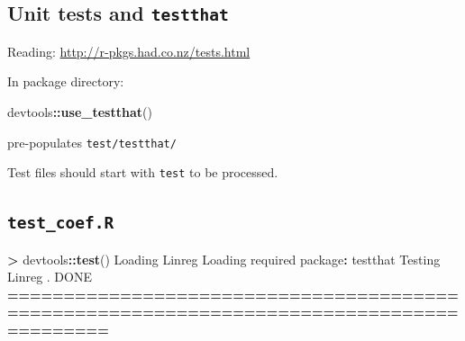 \documentclass[]{book}
\newenvironment{Shaded}{\begin{snugshade}}{\end{snugshade}}
\newcommand{\KeywordTok}[1]{\textcolor[rgb]{0.13,0.29,0.53}{\textbf{#1}}}
\newcommand{\DataTypeTok}[1]{\textcolor[rgb]{0.13,0.29,0.53}{#1}}
\newcommand{\DecValTok}[1]{\textcolor[rgb]{0.00,0.00,0.81}{#1}}
\newcommand{\StringTok}[1]{\textcolor[rgb]{0.31,0.60,0.02}{#1}}
\newcommand{\OperatorTok}[1]{\textcolor[rgb]{0.81,0.36,0.00}{\textbf{#1}}}
\newcommand{\ErrorTok}[1]{\textcolor[rgb]{0.64,0.00,0.00}{\textbf{#1}}}
\newcommand{\NormalTok}[1]{#1}
\theoremstyle{definition}
\theoremstyle{definition}
\theoremstyle{definition}
\theoremstyle{remark}
\begin{document}
\subsection{\texorpdfstring{Unit tests and
\texttt{testthat}}{Unit tests and testthat}}\label{unit-tests-and-testthat}

Reading: \url{http://r-pkgs.had.co.nz/tests.html}

In package directory:

\begin{Shaded}
\begin{Highlighting}[]
\NormalTok{devtools}\OperatorTok{::}\KeywordTok{use_testthat}\NormalTok{()}
\end{Highlighting}
\end{Shaded}

pre-populates \texttt{test/testthat/}

Test files should start with \texttt{test} to be processed.

\subsection{\texorpdfstring{\texttt{test\_coef.R}}{test\_coef.R}}\label{test_coef.r}

\begin{Shaded}
\end{Shaded}

\begin{Shaded}
\begin{Highlighting}[]
\OperatorTok{>}\StringTok{ }\NormalTok{devtools}\OperatorTok{::}\KeywordTok{test}\NormalTok{()}
\NormalTok{Loading Linreg}
\NormalTok{Loading required package}\OperatorTok{:}\StringTok{ }\NormalTok{testthat}
\NormalTok{Testing Linreg}
\NormalTok{.}
\NormalTok{DONE }\OperatorTok{==}\ErrorTok{=======================================================================================}
\end{Highlighting}
\end{Shaded}
\end{document}
